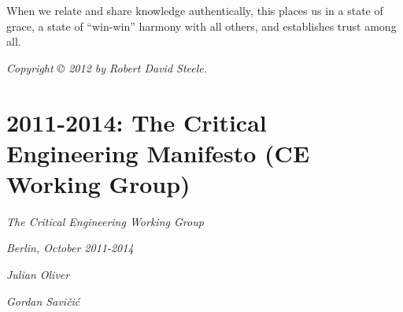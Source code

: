 \documentclass[letterpaper,12pt,english]{sphinxmanual}
\begin{document}
When we relate and share knowledge authentically, this places us in a state of grace, a state of ``win-win'' harmony with all others, and establishes trust among all.

\emph{Copyright © 2012 by Robert David Steele.}


\chapter{2011-2014: The Critical Engineering Manifesto (CE Working Group)}
\label{2014:the-critical-engineering-manifesto-ce-working-group}\label{2014::doc}
\emph{The Critical Engineering Working Group}

\emph{Berlin, October 2011-2014}

\emph{Julian Oliver}

\emph{Gordan Savičić}
\end{document}
